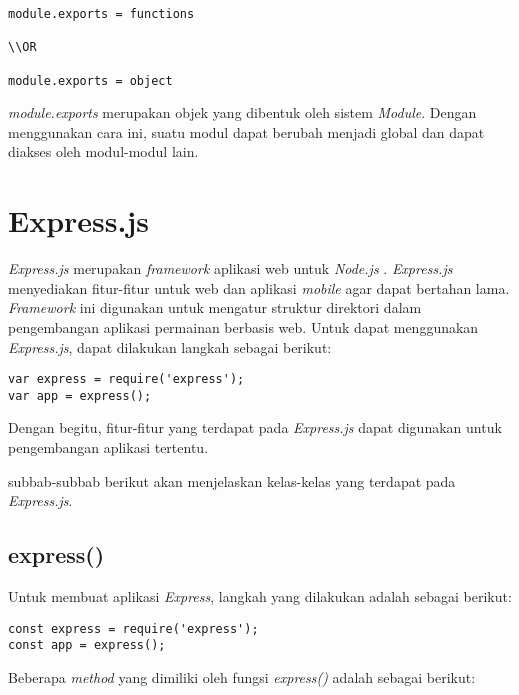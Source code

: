 \begin{lstlisting}
module.exports = functions

\\OR

module.exports = object
\end{lstlisting}

\textit{module.exports} merupakan objek yang dibentuk oleh sistem \textit{Module}. Dengan menggunakan cara ini, suatu modul dapat berubah menjadi global dan dapat diakses oleh modul-modul lain.


\section{Express.js}
\label{sec:Express.js}

\textit{Express.js} merupakan \textit{framework} aplikasi web untuk \textit{Node.js} \cite{tj:10:expressjs}. \textit{Express.js} menyediakan fitur-fitur untuk web dan aplikasi \textit{mobile} agar dapat bertahan lama. \textit{Framework} ini digunakan untuk mengatur struktur direktori dalam pengembangan aplikasi permainan berbasis web. Untuk dapat menggunakan \textit{Express.js}, dapat dilakukan langkah sebagai berikut: 
\begin{lstlisting}
var express = require('express');
var app = express();
\end{lstlisting}

Dengan begitu, fitur-fitur yang terdapat pada \textit{Express.js} dapat digunakan untuk pengembangan aplikasi tertentu.

subbab-subbab berikut akan menjelaskan kelas-kelas yang terdapat pada \textit{Express.js}.

\subsection{express()}
Untuk membuat aplikasi \textit{Express}, langkah yang dilakukan adalah sebagai berikut:
\begin{lstlisting}
const express = require('express');
const app = express();
\end{lstlisting}

Beberapa \textit{method} yang dimiliki oleh fungsi \textit{express()} adalah sebagai berikut:

